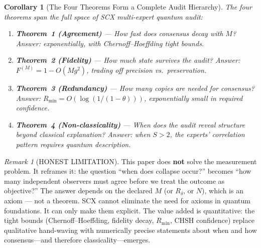 \documentclass[11pt,a4paper]{article}
\newtheorem{corollary}[theorem]{Corollary}
\theoremstyle{definition}
\theoremstyle{remark}
\newtheorem{remark}[theorem]{Remark}
\begin{document}
\begin{corollary}[The Four Theorems Form a Complete Audit Hierarchy]
The four theorems span the full space of SCX multi-expert quantum audit:
\begin{enumerate}[nosep]
    \item \textbf{Theorem~1 (Agreement)} --- How fast does consensus decay with $M$? Answer: exponentially, with Chernoff--Hoeffding tight bounds.
    \item \textbf{Theorem~2 (Fidelity)} --- How much state survives the audit? Answer: $F^{(M)} = 1 - O(M g^2)$, trading off precision vs.\ preservation.
    \item \textbf{Theorem~3 (Redundancy)} --- How many copies are needed for consensus? Answer: $R_{\min} = O(\log(1/(1-\theta)))$, exponentially small in required confidence.
    \item \textbf{Theorem~4 (Non-classicality)} --- When does the audit reveal structure beyond classical explanation? Answer: when $S > 2$, the experts' correlation pattern requires quantum description.
\end{enumerate}
\end{corollary}

\begin{remark}[HONEST LIMITATION]
This paper does \textbf{not} solve the measurement problem. It reframes it: the question ``when does collapse occur?'' becomes ``how many independent observers must agree before we treat the outcome as objective?'' The answer depends on the declared $M$ (or $R_\delta$, or $N$), which is an axiom --- not a theorem. SCX cannot eliminate the need for axioms in quantum foundations. It can only make them explicit. The value added is quantitative: the tight bounds (Chernoff--Hoeffding, fidelity decay, $R_{\min}$, CHSH confidence) replace qualitative hand-waving with numerically precise statements about when and how consensus---and therefore classicality---emerges.
\end{remark}
\end{document}
